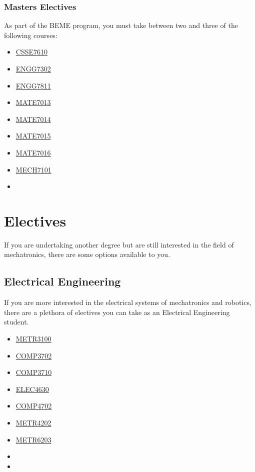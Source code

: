 \documentclass[a4paper,12pt]{report}
\begin{document}
\subsection{Masters Electives}
As part of the BEME program, you must take between two and three of the following courses:
\begin{multicols}{3}
    \begin{itemize}
        \item \hyperlink{CSSE7610}{CSSE7610}
        \item \hyperlink{ENGG7302}{ENGG7302}
        \item \hyperlink{ENGG7811}{ENGG7811}
        \item \hyperlink{MATE7013}{MATE7013}
        \item \hyperlink{MATE7014}{MATE7014}
        \item \hyperlink{MATE7015}{MATE7015}
        \item \hyperlink{MATE7016}{MATE7016}
        \item \hyperlink{MECH7101}{MECH7101}
        \item[]
    \end{itemize}
\end{multicols}


\chapter{Electives}
If you are undertaking another degree but are still interested in the field of mechatronics, there are some options available to you.

\section{Electrical Engineering}
If you are more interested in the electrical systems of mechatronics and robotics, there are a plethora of electives you can take as an Electrical Engineering student.
\begin{multicols}{3}
    \begin{itemize}
        \item \hyperlink{METR3100}{METR3100}
        \item \hyperlink{COMP3702}{COMP3702}
        \item \hyperlink{COMP3710}{COMP3710}
        \item \hyperlink{ELEC4630}{ELEC4630}
        \item \hyperlink{COMP4702}{COMP4702}
        \item \hyperlink{METR4202}{METR4202}
        \item \hyperlink{METR6203}{METR6203}
        \item[]
        \item[]
    \end{itemize}
\end{multicols}
\end{document}
